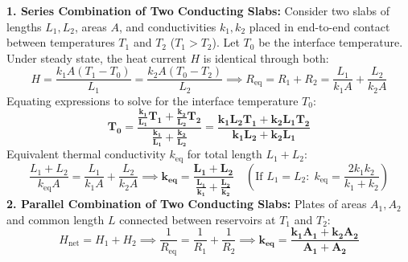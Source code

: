 \documentclass[10pt,twoside,openright]{book}
\begin{document}
\begin{formulabox}
\textbf{1. Series Combination of Two Conducting Slabs:}
Consider two slabs of lengths $L_1, L_2$, areas $A$, and conductivities $k_1, k_2$ placed in end-to-end contact between temperatures $T_1$ and $T_2$ ($T_1 > T_2$). Let $T_0$ be the interface temperature. Under steady state, the heat current $H$ is identical through both:
\begin{equation}
  H = \frac{k_1 A (T_1 - T_0)}{L_1} = \frac{k_2 A (T_0 - T_2)}{L_2} \implies R_{\text{eq}} = R_1 + R_2 = \frac{L_1}{k_1 A} + \frac{L_2}{k_2 A}
\end{equation}
Equating expressions to solve for the interface temperature $T_0$:
\begin{equation}
  \mathbf{T_0 = \frac{\frac{k_1}{L_1} T_1 + \frac{k_2}{L_2} T_2}{\frac{k_1}{L_1} + \frac{k_2}{L_2}} = \frac{k_1 L_2 T_1 + k_2 L_1 T_2}{k_1 L_2 + k_2 L_1}}
\end{equation}
Equivalent thermal conductivity $k_{\text{eq}}$ for total length $L_1 + L_2$:
\begin{equation}
  \frac{L_1 + L_2}{k_{\text{eq}} A} = \frac{L_1}{k_1 A} + \frac{L_2}{k_2 A} \implies \mathbf{k_{\text{eq}} = \frac{L_1 + L_2}{\frac{L_1}{k_1} + \frac{L_2}{k_2}}} \quad \left(\text{If } L_1 = L_2: \; k_{\text{eq}} = \frac{2k_1 k_2}{k_1 + k_2}\right)
\end{equation}
\textbf{2. Parallel Combination of Two Conducting Slabs:}
Plates of areas $A_1, A_2$ and common length $L$ connected between reservoirs at $T_1$ and $T_2$:
\begin{equation}
  H_{\text{net}} = H_1 + H_2 \implies \frac{1}{R_{\text{eq}}} = \frac{1}{R_1} + \frac{1}{R_2} \implies \mathbf{k_{\text{eq}} = \frac{k_1 A_1 + k_2 A_2}{A_1 + A_2}}
\end{equation}
\end{formulabox}
\end{document}
